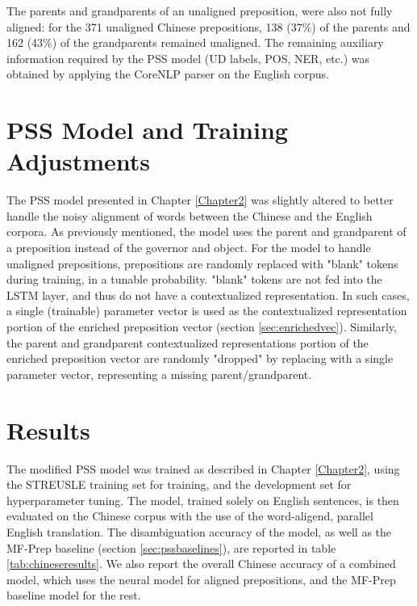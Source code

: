 The parents and grandparents of an unaligned preposition, were also not fully aligned: for the 371 unaligned Chinese prepositions, 138 (37\%) of the parents and 162 (43\%) of the grandparents remained unaligned. The remaining auxiliary information required by the PSS model (UD labels, POS, NER, etc.) was obtained by applying the CoreNLP parser on the English corpus. 

\section{PSS Model and Training Adjustments} \label{sec:pssmodelmod}

The PSS model presented in Chapter \ref{Chapter2} was slightly altered to better handle the noisy alignment of words between the Chinese and the English corpora. As previously mentioned, the model uses the parent and grandparent of a preposition instead of the governor and object. For the model to handle unaligned prepositions, prepositions are randomly replaced with "blank" tokens during training, in a tunable probability. "blank" tokens are not fed into the LSTM layer, and thus do not have a contextualized representation. In such cases, a single (trainable) parameter vector is used as the contextualized representation portion of the enriched preposition vector (section \ref{sec:enrichedvec}). Similarly, the parent and grandparent contextualized representations portion of the enriched preposition vector are randomly "dropped" by replacing with a single parameter vector, representing a missing parent/grandparent. 

\section{Results} 

The modified PSS model was trained as described in Chapter \ref{Chapter2}, using the STREUSLE training set for training, and the development set for hyperparameter tuning. The model, trained solely on English sentences, is then evaluated on the Chinese corpus with the use of the word-aligend, parallel English translation. The disambiguation accuracy of the model, as well as the MF-Prep baseline (section \ref{sec:pssbaselines}), are reported in table \ref{tab:chineseresults}. We also report the overall Chinese accuracy of a combined model, which uses the neural model for aligned prepositions, and the MF-Prep baseline model for the rest.

